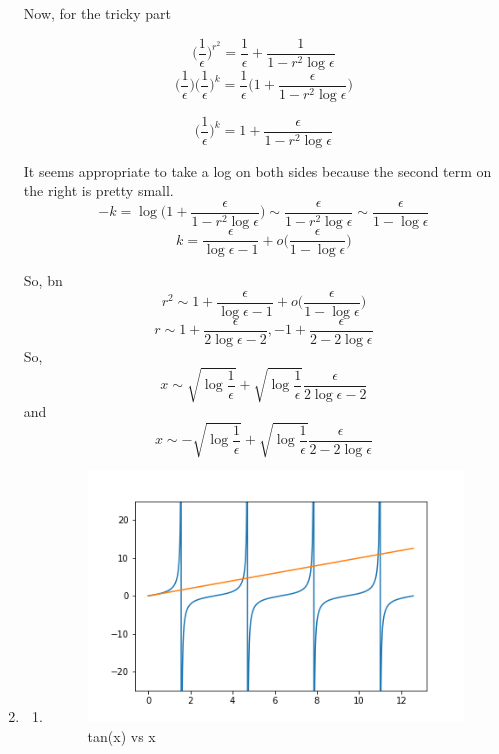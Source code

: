 \documentclass[letterpaper,12pt]{article}
\begin{document}
\begin{enumerate}
Now, for the tricky part

\[\bigg(\frac{1}{\epsilon}\bigg)^{r^2} = \frac{1}{\epsilon} + \frac{1}{1-r^2 \log \epsilon}\]
\[ \bigg(\frac{1}{\epsilon}\bigg)\bigg(\frac{1}{\epsilon}\bigg)^{k} = \frac{1}{\epsilon} \bigg(1 + \frac{\epsilon}{1-r^2 \log \epsilon}\bigg)\]

\[ \bigg(\frac{1}{\epsilon}\bigg)^{k} = 1 + \frac{\epsilon}{1-r^2 \log \epsilon}
\]

It seems appropriate to take a log on both sides because the second term on the right is pretty small.
\[-k =\log \bigg(1 + \frac{\epsilon}{1-r^2 \log \epsilon}\bigg) \sim \frac{\epsilon}{1-r^2 \log \epsilon} \sim \frac{\epsilon}{1- \log \epsilon} \]
\[k =\frac{\epsilon}{ \log \epsilon - 1} + o\bigg( \frac{\epsilon}{1- \log \epsilon}  \bigg)\]


So,  bn
\[r^2 \sim 1 + \frac{\epsilon}{ \log \epsilon - 1} + o\bigg( \frac{\epsilon}{1- \log \epsilon}  \bigg) \]
 \[r \sim 1 + \frac{\epsilon}{2 \log \epsilon - 2} , -1+ \frac{\epsilon}{ 2- 2\log \epsilon } \]
  So,
 \[x \sim  \sqrt{\log \frac{1}{\epsilon}}  +   \sqrt{\log \frac{1}{\epsilon}} \frac{\epsilon}{ 2\log \epsilon - 2} \]
 and \[ x \sim - \sqrt{\log \frac{1}{\epsilon}} +   \sqrt{\log \frac{1}{\epsilon}} \frac{\epsilon}{ 2- 2\log \epsilon } \]

\item

\begin{enumerate}

\item


\begin{figure}[H]
\begin{centering}
\includegraphics[width=4in]{tan.png}
\caption{tan(x) vs x}
\end{centering}
\end{figure}


\end{enumerate}
\end{enumerate}
\end{document}
